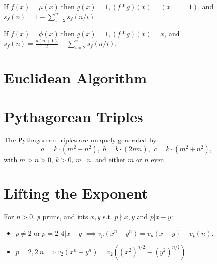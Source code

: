    If $f(x)=\mu(x)$ then $g(x)=1, (f*g)(x)=(x == 1)$, and $s_f(n)=1-\sum_{i=2}^ns_f(n/i)$.

    If $f(x)=\phi(x)$ then $g(x)=1, (f*g)(x)=x$, and $s_f(n)=\frac{n(n+1)}{2}-\sum_{i=2}^ns_f(n/i).$

	

\section{Euclidean Algorithm}

	
\section{Pythagorean Triples}
	 The Pythagorean triples are uniquely generated by
	 \[ a=k\cdot (m^{2}-n^{2}),\ \,b=k\cdot (2mn),\ \,c=k\cdot (m^{2}+n^{2}), \]
	 with $m > n > 0$, $k > 0$, $m \bot n$, and either $m$ or $n$ even.

\section{Lifting the Exponent}

For $n>0$, $p$ prime, and ints $x,y$ s.t. $p\nmid x,y$ and $p|x-y$:


\begin{itemize}
\item $p\neq 2$ or $p=2, 4|x-y$ $\implies v_p(x^n - y^n) = v_p(x - y) + v_p(n)$.
\item $p=2, 2|n \implies v_2(x^n-y^n)=v_2((x^2)^{n/2}-(y^2)^{n/2})$.
\end{itemize}
